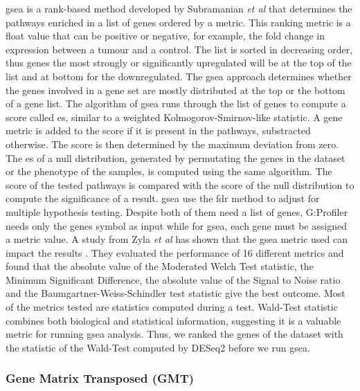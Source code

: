 \acrshort{gsea} is a rank-based method developed by Subramanian \textit{et al} \cite*{Subramanian2005} that determines the pathways enriched in a list of genes ordered by a metric.
This ranking metric is a float value that can be positive or negative, for example, the fold change in expression between a tumour and a control.
The list is sorted in decreasing order, thus genes the most strongly or significantly upregulated will be at the top of the list and at bottom for the downregulated.
The \acrshort{gsea} approach determines whether the genes involved in a gene set are mostly distributed at the top or the bottom of a gene list.
The algorithm of \acrshort{gsea} runs through the list of genes to compute a score called  \acrfull{es}, similar to a weighted Kolmogorov-Smirnov-like statistic.
A gene metric is added to the score if it is present in the pathways, substracted otherwise.
The score is then determined by the maximum deviation from zero.
The \acrshort{es} of a null distribution, generated by permutating the genes in the dataset or the phenotype of the samples, is computed using the same algorithm.
The score of the tested pathways is compared with the score of the null distribution to compute the significance of a result.
\acrshort{gsea} use the \acrshort{fdr} method to adjust for multiple hypothesis testing.
Despite both of them need a list of genes, G:Profiler needs only the genes symbol as input while for \acrshort{gsea}, each gene must be assigned a metric value.
A study from Zyla \textit{et al} has shown that the \acrshort{gsea} metric used can impact the results \cite*{Zyla2017}.
They evaluated the performance of 16 different metrics and found that the absolute value of the Moderated Welch Test statistic, the Minimum Significant Difference, the absolute value of the Signal to Noise ratio and the Baumgartner-Weiss-Schindler test statistic give the best outcome.
Most of the metrics tested are statistics computed during a test.
Wald-Test statistic combines both biological and statistical information, suggesting it is a valuable metric for running \acrshort{gsea} analysis.
Thus, we ranked the genes of the dataset with the statistic of the Wald-Test computed by DESeq2 before we run \acrshort{gsea}.

\subsubsection{Gene Matrix Transposed (GMT)}

